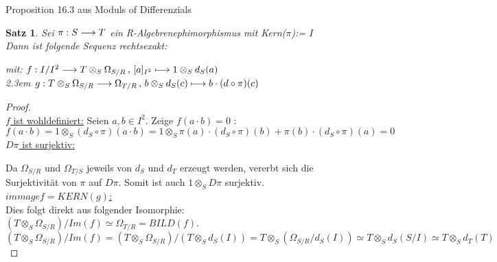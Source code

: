 \documentclass[10pt,a4paper]{report}
\newtheorem{satz}{Satz}
\newcommand{\functionfront}[3]{\nolinebreak{#1:#2 \longrightarrow #3}}
\newcommand{\function}[5]{\nolinebreak{#1:#2 \longrightarrow #3 \, , \, #4 \longmapsto #5}}
\newcommand{\divR}[2]{\Omega_{#1/#2}}
\newcommand{\tensor}[3]{#1 \otimes_#2 #3}
\newcommand{\kernel}[1]{KERN(#1)}
\newcommand{\immage}[1]{BILD(#1)}
\begin{document}
Proposition 16.3 aus Moduls of Differenzials
\begin{satz}
\raggedright
Sei $\functionfront{\pi}{S}{T}$ ein R-Algebrenephimorphismus mit Kern($\pi$):= I \\
Dann ist folgende Sequenz rechtsexakt: \\
\begin{center}
\end{center}
\begin{spacing}{1.5}
mit: $\function{f}{I/I^2}{{\tensor{T}{S}{\divR{S}{R}}}}{[a]_{I^2}}{\tensor{1}{S}{d_S(a)}}$\\
\leftskip2.3em $\function{g}{\tensor{T}{S}{\divR{S}{R}}}{\divR{T}{R}}{\tensor{b}{S}{d_S(c)}}{b \cdot (d \circ \pi)(c)}$
\end{spacing}
\end{satz}

\begin{proof} \ \\
\underline{$f$ ist wohldefiniert:} Seien $a,b\in I^2$. Zeige $f(a \cdot b)=0$ :
$$ f(a \cdot b) =
\tensor{1}{S}{( d_S \circ \pi )(a \cdot b)} =
\tensor{1}{S}{\pi(a) \cdot (d_S \circ \pi )(b) + \pi(b) \cdot ( d_S \circ \pi )(a)} =0$$
\underline{$D\pi$ ist surjektiv:}

\begin{center}
\end{center}
Da $\divR{S}{R}$ und $\divR{T}{S}$ jeweils von $d_S$ und $d_T$ erzeugt werden, vererbt sich die Surjektivität von $\pi$ auf $D\pi$. Somit ist auch $\tensor{1}{S}{D\pi}$ surjektiv.\\
\underline{$immage{f}=\kernel{g}$:}\\ Dies folgt direkt aus folgender Isomorphie: $(\tensor{T}{S}{\divR{S}{R}})/Im(f) \simeq \divR{T}{R} = \immage{f}$.
$$(\tensor{T}{S}{\divR{S}{R}})/Im(f) = (\tensor{T}{S}{\divR{S}{R}})/(\tensor{T}{S}{d_S(I)}) = \tensor{T}{S}{(\divR{S}{R}/d_S(I))} \simeq \tensor{T}{S}{d_S(S/I)} \simeq \tensor{T}{S}{d_T(T)}$$

\end{proof}
\end{document}
